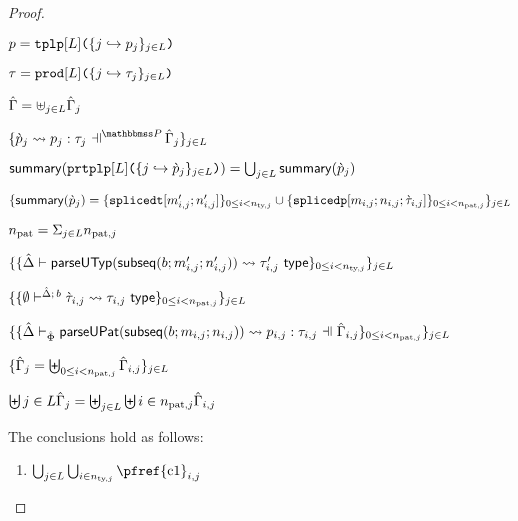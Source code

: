 \begin{grayparbox}
\begin{proof}
\begin{byCases}
\begin{pfsteps*}
      \item $p=\texttt{tplp}[L]\texttt{(}\{j \hookrightarrow p_{j}\}_{j \in L}\texttt{)}$ 
      \item $\tau = \texttt{prod}[L]\texttt{(}\{j \hookrightarrow \tau_{j}\}_{j \in L}\texttt{)}$ 
      \item $\hat\Gamma=\uplus_{j \in L} \hat\Gamma_j$  
      \item $\{\cvalidP{\upctx_j}{\pscenev}{\cpv_j}{p_j}{\tau_j}\}_{j \in \labelset}$  
      \item $\mathsf{summary}(\texttt{prtplp}[L]\texttt{(}\{j \hookrightarrow \grave{p}_{j}\}_{j \in L}\texttt{)}) = \bigcup_{j \in L} \mathsf{summary}(\grave{p}_j)$ 
      \item $\{ \mathsf{summary}(\grave{p}_j) = \{\texttt{splicedt}[m'_{i,j}; n'_{i,j}]\}_{0 \leq i < n_\text{ty,$j$}} \cup \{\texttt{splicedp}[m_{i,j}; n_{i,j}; \grave{\tau}_{i,j}]\}_{0 \leq i < n_\text{pat,$j$}} \}_{j \in L}$ 
      \item $n_\text{pat} = \Sigma_{j \in L} n_\text{pat,$j$}$ 
      \item $\{\{
            \hat{\Delta} \vdash 
              \mathsf{parseUTyp}(\mathsf{subseq}(b; m'_{i,j}; n'_{i,j}))
             \leadsto \tau'_{i,j}~\mathsf{type}
          \}_{0 \leq i < n_\text{ty,$j$}}\}_{j \in L}$  
      \item $\{\{
        \emptyset\vdash^{
          \hat{\Delta};\,b
        } 
          \grave{\tau}_{i,j}
         \leadsto \tau_{i,j}~\mathsf{type}
      \}_{0 \leq i < n_\text{pat,$j$}}\}_{j \in L}$  
      \item $\{\sseq{
        \patExpands
          {\upctx_{i,j}}
          {\uPhi}
          {\parseUPatF{\bsubseq{b}{m_{i,j}}{n_{i,j}}}}
          {p_{i,j}}
          {\tau_{i,j}}
      }{\npatj}\}_{j \in \labelset}$  
    \item $\{\hat\Gamma_j = \biguplus_{0 \leq i < n_\text{pat,$j$}} \hat\Gamma_{i,j}\}_{j \in L}$ 
    \item $\biguplus{j \in L} \hat\Gamma_{j} = \biguplus_{j \in L} \biguplus{i \in n_\text{pat,$j$}} \hat\Gamma_{i,j}$ 
    \end{pfsteps*}
    The conclusions hold as follows:
    \begin{enumerate}
      \item $\bigcup_{j \in \labelset} \bigcup_{i \in \ntyj} \text{\pfref{c1}}_{i,j}$

\end{enumerate}
\end{byCases}
\end{proof}
\end{grayparbox}
